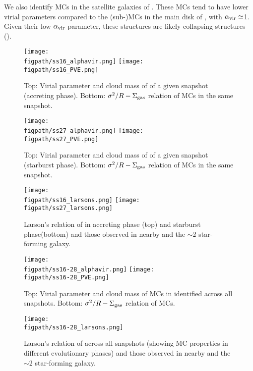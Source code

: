 \documentclass[apj]{emulateapj} %
\begin{document}
We also identify MCs in the satellite galaxies of \flower. These MCs 
tend to have lower virial parameters compared to the (sub-)MCs in the main disk of \flower, 
with $\alpha_{\rm vir}\simeq$1.
Given their low $\alpha_{\rm vir}$ parameter,
these structures are likely collapsing structures (). 


\begin{figure*}[htbp]
\centering
\texttt{[image: \\figpath/ss16\_alphavir.png]}  
\texttt{[image: \\figpath/ss16\_PVE.png]}
\caption{
Top: Virial parameter and cloud mass of \flower of a given snapshot (accreting phase).
Bottom: $\sigma^2/R - \Sigma_{\rm gas}$ relation of MCs in the same snapshot.
\label{fig:alpha16}}
\end{figure*}


\begin{figure*}[htbp]
\centering
\texttt{[image: \\figpath/ss27\_alphavir.png]}  
\texttt{[image: \\figpath/ss27\_PVE.png]}
\caption{
Top: Virial parameter and cloud mass of \flower of a given snapshot (starburst phase).
Bottom: $\sigma^2/R - \Sigma_{\rm gas}$ relation of MCs in the same snapshot.
\label{fig:alpha27}}
\end{figure*}

\begin{figure*}[htbp]
\centering
\texttt{[image: \\figpath/ss16\_larsons.png]}  
\texttt{[image: \\figpath/ss27\_larsons.png]}  
\caption{
Larson's relation of \flower in 
accreting phase (top) and
starburst phase(bottom) and 
those observed in nearby and the \z$\sim$2 star-forming galaxy.
\label{fig:larsons_single}}
\end{figure*}


\begin{figure*}[htbp]
\centering
\texttt{[image: \\figpath/ss16-28\_alphavir.png]}  
\texttt{[image: \\figpath/ss16-28\_PVE.png]}
\caption{
Top: Virial parameter and cloud mass of MCs in \flower identified across all snapshots.
Bottom: $\sigma^2/R - \Sigma_{\rm gas}$ relation of MCs.
\label{fig:alpha16-28}}
\end{figure*}

\begin{figure*}[htbp]
\centering
\texttt{[image: \\figpath/ss16-28\_larsons.png]}  
\caption{
Larson's relation of \flower across all snapshots (showing MC properties in different evolutionary 
phases) and 
those observed in nearby and the \z$\sim$2 star-forming galaxy.
\label{fig:larsons16-28}}
\end{figure*}
\end{document}
